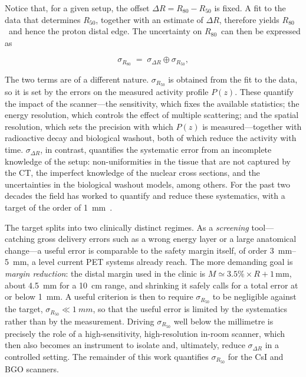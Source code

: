 \documentclass[11pt]{article}
\newcommand{\Rc}{\ensuremath{R_{50}}}
\newcommand{\Roc}{\ensuremath{R_{80}}}
\newcommand{\DR}{\ensuremath{\Delta R}}
\begin{document}
Notice that, for a given setup, the offset $\DR = \Roc - \Rc$ is fixed. A fit to
the data that determines \Rc, together with an estimate of \DR, therefore yields
\Roc\ and hence the proton distal edge. The uncertainty on \Roc\ can then be
expressed as


\begin{equation}
  \sigma_{\Roc} \;=\; \sigma_{\DR} \oplus \sigma_{\Rc},
  \label{eq:sigma_budget}
\end{equation}

The two terms are of a different nature. $\sigma_{\Rc}$ is obtained from the fit
to the data, so it is set by the errors on the measured activity profile $P(z)$.
These quantify the impact of the scanner---the sensitivity, which fixes the
available statistics; the energy resolution, which controls the effect of
multiple scattering; and the spatial resolution, which sets the precision with
which $P(z)$ is measured---together with radioactive decay and biological
washout, both of which reduce the activity with time. $\sigma_{\DR}$, in
contrast, quantifies the systematic error from an incomplete knowledge of the
setup: non-uniformities in the tissue that are not captured by the CT, the
imperfect knowledge of the nuclear cross sections, and the uncertainties in the
biological washout models, among others. For the past two decades the field has
worked to quantify and reduce these systematics, with a target of the order of
\SI{1}{mm}~\cite{Knopf2009,Paganetti2012}.

The target splits into two clinically distinct regimes. As a \emph{screening} tool---catching gross delivery errors such as a
wrong energy layer or a large anatomical change---a useful error is comparable to
the safety margin itself, of order \SIrange{3}{5}{\milli\metre}, a level current PET systems already reach. 
The more demanding goal is \emph{margin
reduction}: the distal margin used in the clinic is
$M \simeq 3.5\%\times R + 1\,\mathrm{mm}$, about \SI{4.5}{mm} for a \SI{10}{cm}
range, and shrinking it safely calls for a total error at or below \SI{1}{mm}.  A useful criterion
is then to require $\sigma_{\Rc}$ to be negligible against the target,
$\sigma_{\Rc} \ll \SI{1}{mm}$, so that the useful error is limited by the
systematics rather than by the measurement. Driving $\sigma_{\Rc}$ well below the
millimetre is precisely the role of a high-sensitivity, high-resolution in-room
scanner, which then also becomes an instrument to isolate and, ultimately,
reduce $\sigma_{\DR}$ in a controlled setting. The remainder of this work
quantifies $\sigma_{\Rc}$ for the CsI and BGO scanners.
\end{document}
